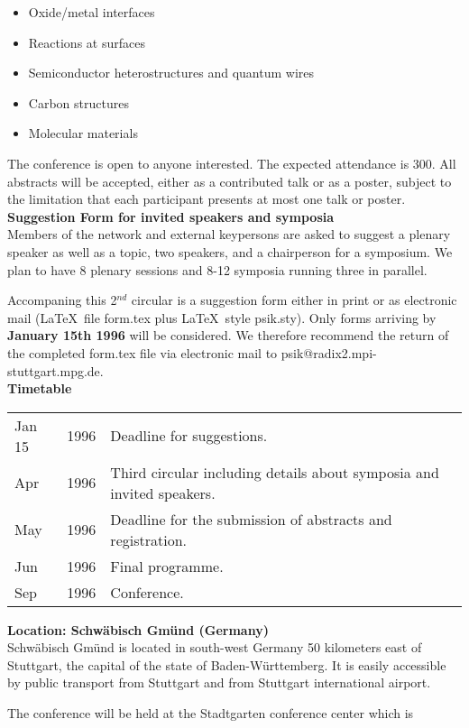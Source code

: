 {\begin{itemize}
\item Oxide/metal interfaces
\item Reactions at surfaces
\item Semiconductor heterostructures and quantum wires
\item Carbon structures
\item Molecular materials
\end{itemize}
The conference is open to anyone interested. The expected attendance is 300.
All abstracts will be accepted, either as a contributed talk or as a
poster, subject to the limitation that each participant presents at most
one talk or poster.\\[3mm]   
{\large\bf Suggestion Form for invited speakers and symposia}\\[5mm]
Members of the network and external keypersons are asked to suggest a plenary speaker as well
as a topic, two speakers, and a chairperson for a symposium. We plan to have 8 plenary sessions
and 8-12 symposia running three in parallel.
\par
Accompaning this 2$^{nd }$ circular is a suggestion form either in print or as
electronic mail (\LaTeX ~file form.tex plus \LaTeX ~style psik.sty).
Only forms arriving by {\large\bf January 15th 1996} will be considered. We therefore recommend
the return of the completed form.tex file via electronic mail to psik@radix2.mpi-stuttgart.mpg.de.\\[5mm]
{\large\bf Timetable}\\[5mm]
\begin{tabular}{l l l }
Jan 15&	1996&	Deadline for suggestions.\\
Apr&	1996&	Third circular including details about symposia and invited speakers.\\
May&	1996&	Deadline for the submission of abstracts and registration.\\
Jun &	1996&	Final programme.\\
Sep&	1996&	Conference.\\[3mm]
\end{tabular}
\par
{\large\bf Location: Schw\"abisch Gm\"und (Germany)}\\[5mm]
Schw\"abisch Gm\"und is located in south-west Germany 50 kilometers east
of Stuttgart, the capital of the state of Baden-W\"urttemberg. It is easily
accessible by public transport from Stuttgart and from Stuttgart
international airport.
\par
The conference will be held at the Stadtgarten conference center which is
}

